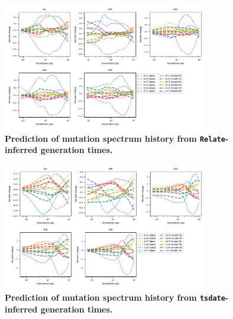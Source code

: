 \documentclass[]{article}
\newcommand{\tsdate}{\texttt{tsdate}\xspace}
\newcommand{\relate}{\texttt{Relate}\xspace}
\begin{document}
\begin{figure}[ht!]
    \centering
    \includegraphics[width=0.8\textwidth]{../plots/goodness-of-fit.DM.relate.max_age.10000.pdf}
    \caption{
        \textbf{Prediction of mutation spectrum history from
        \relate-inferred generation times.}
    }
    \label{fig:relate-fit}
\end{figure}


\begin{figure}[ht!]
    \centering
    \includegraphics[width=0.8\textwidth]{../plots/goodness-of-fit.DM.tsdate.max_age.10000.pdf}
    \caption{
        \textbf{Prediction of mutation spectrum history from
        \tsdate-inferred generation times.}
    }
    \label{fig:tsdate-fit}
\end{figure}


\break
\end{document}
